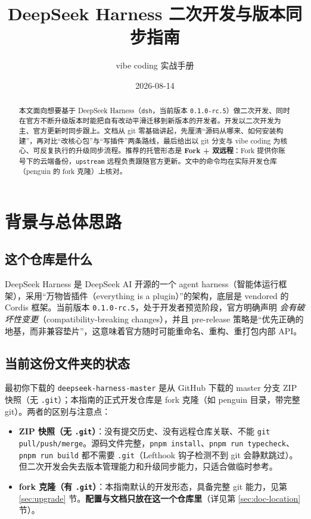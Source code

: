 \documentclass[11pt]{ctexart}
\title{\bfseries DeepSeek Harness 二次开发与版本同步指南}
\author{vibe coding 实战手册}
\date{2026-08-14}
\newcommand{\code}[1]{\texttt{\small #1}}
\begin{document}
\maketitle

\begin{abstract}
本文面向想要基于 DeepSeek Harness（\code{dsh}，当前版本 \code{0.1.0-rc.5}）做二次开发、同时在官方不断升级版本时能把自有改动平滑迁移到新版本的开发者。开发以二次开发为主、官方更新时同步跟上。文档从 git 零基础讲起，先厘清“源码从哪来、如何安装构建”，再对比“改核心包”与“写插件”两条路线，最后给出以 git 分支与 vibe coding 为核心、可反复执行的升级同步流程。推荐的托管形态是 \textbf{Fork + 双远程}：Fork 提供你账号下的云端备份，\code{upstream} 远程负责跟随官方更新。文中的命令均在实际开发仓库（penguin 的 fork 克隆）上核对。
\end{abstract}

\tableofcontents

\section{背景与总体思路}

\subsection{这个仓库是什么}

DeepSeek Harness 是 DeepSeek AI 开源的一个 agent harness（智能体运行框架），采用“万物皆插件（everything is a plugin）”的架构，底层是 vendored 的 Cordis 框架。当前版本 \code{0.1.0-rc.5}，处于开发者预览阶段，官方明确声明 \emph{会有破坏性变更}（compatibility-breaking changes），并且 pre-release 策略是“优先正确的地基，而非兼容垫片”，这意味着官方随时可能重命名、重构、重打包内部 API。

\subsection{当前这份文件夹的状态}

最初你下载的 \code{deepseek-harness-master} 是从 GitHub 下载的 master 分支 ZIP 快照（无 \code{.git}）；本指南的正式开发仓库是 fork 克隆（如 penguin 目录，带完整 git）。两者的区别与注意点：

\begin{itemize}[itemsep=1pt]
  \item \textbf{ZIP 快照（无 \code{.git}）}：没有提交历史、没有远程仓库关联、不能 \code{git pull/push/merge}。源码文件完整，\code{pnpm install}、\code{pnpm run typecheck}、\code{pnpm run build} 都不需要 \code{.git}（Lefthook 钩子检测不到 git 会静默跳过）。但二次开发会失去版本管理能力和升级同步能力，只适合做临时参考。
  \item \textbf{fork 克隆（有 \code{.git}）}：本指南默认的开发形态，具备完整 git 能力，见第 \ref{sec:upgrade} 节。\textbf{配置与文档只放在这一个仓库里}（详见第 \ref{sec:doc-location} 节）。
\end{itemize}
\end{document}
